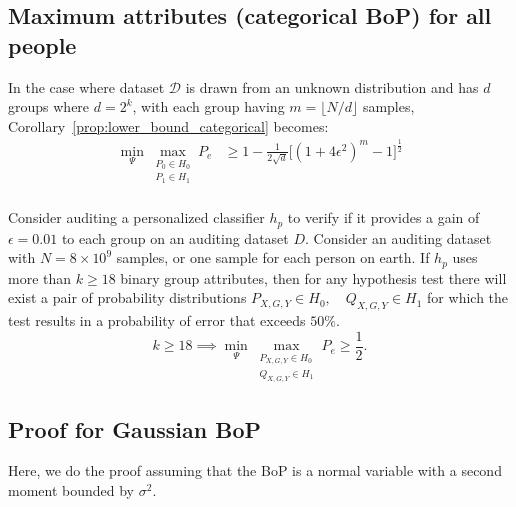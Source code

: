 \subsection{Maximum attributes (categorical BoP) for all people}\label{sec:max_attributes_categorical}
 In the case where dataset $\mathcal{D}$ is drawn from an unknown distribution and has $d$ groups where $d=2^k$, with each group having $m = \lfloor N/d \rfloor$ samples, Corollary~\ref{prop:lower_bound_categorical} becomes:
\begin{align*}
          \min _{\Psi} 
    \max _{\substack{P_0 \in H_0 \\ P_1 \in H_1}}
        P_e 
        &\geq 1 - \frac{1}{2\sqrt{d}} 
        \Bigg[
            \left(1+4\epsilon^2\right)^m
            -
            1
            \Bigg]^{\frac{1}{2}}\\
\end{align*}
\begin{corollary} 
 Consider auditing a personalized classifier $h_p$ to verify if it provides a gain of $\epsilon =0.01$ to each group on an auditing dataset $D$. Consider an auditing dataset with $N = 8 \times 10^9$ samples, or one sample for each person on earth. If $h_p$ uses more than $k \geq 18$ binary group attributes, then for any hypothesis test there will exist a pair of probability distributions $P_{X,G,Y} \in H_0, \quad Q_{X,G,Y} \in H_1$ for which the test results in a probability of error that exceeds $50 \%$. 
\begin{equation}
       k \geq 18 \implies \min_{\Psi} \max_{\substack{P_{X,G,Y} \in H_0 \\ Q_{X,G,Y} \in H_1}} P_e \geq \frac{1}{2}.
\end{equation}
\end{corollary}


\subsection{Proof for Gaussian BoP}\label{sec:proof-real-valued}

Here, we do the proof assuming that the BoP is a normal variable with a second moment bounded by $\sigma^2$.


